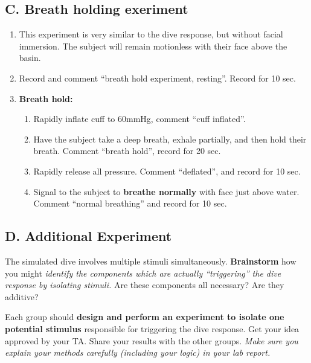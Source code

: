 \documentclass[
  letterpaper,
  DIV=11,
  numbers=noendperiod,
  oneside]{scrartcl}
\providecommand{\tightlist}{%
  \setlength{\itemsep}{0pt}\setlength{\parskip}{0pt}}\usepackage{longtable,booktabs,array}
\begin{document}
\hypertarget{c.-breath-holding-exeriment}{%
\subsection{C. Breath holding
exeriment}\label{c.-breath-holding-exeriment}}

\begin{enumerate}
\def\labelenumi{\arabic{enumi}.}
\tightlist
\item
  This experiment is very similar to the dive response, but without
  facial immersion. The subject will remain motionless with their face
  above the basin.
\item
  Record and comment {``breath hold experiment, resting''}. Record for
  10 sec.~
\item
  \textbf{Breath hold:}

  \begin{enumerate}
  \def\labelenumii{\alph{enumii}.}
  \tightlist
  \item
    Rapidly inflate cuff to 60mmHg, comment {``cuff inflated''}.\\
  \item
    Have the subject take a deep breath, exhale partially, and then hold
    their breath. Comment {``breath hold''}, record for 20 sec.~
  \item
    Rapidly release all pressure. Comment {``deflated''}, and record for
    10 sec.\\
  \item
    Signal to the subject to \textbf{breathe normally} with face just
    above water. Comment {``normal breathing''} and record for 10 sec.~
  \end{enumerate}
\end{enumerate}

\hypertarget{d.-additional-experiment}{%
\subsection{D. Additional Experiment}\label{d.-additional-experiment}}

The simulated dive involves multiple stimuli simultaneously.
\textbf{Brainstorm} how you might \emph{identify the components which
are actually ``triggering'' the dive response by isolating stimuli.} Are
these components all necessary? Are they additive?

Each group should \textbf{design and perform an experiment to isolate
one potential stimulus} responsible for triggering the dive response.
Get your idea approved by your TA. Share your results with the other
groups. \emph{Make sure you explain your methods carefully (including
your logic) in your lab report.}
\end{document}
